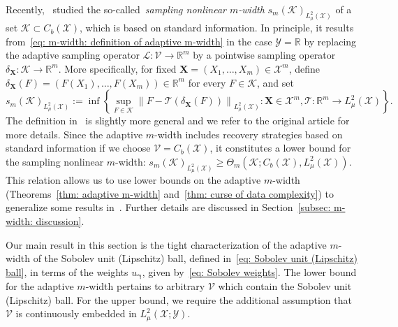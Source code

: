 \documentclass[namedate,webpdf]{ima-authoring-template-blank}
\newcommand*{\nm}[1]{{\left\|#1\right \|}}
\numberwithin{counter}{section}
\numberwithin{equation}{section}
\theoremstyle{plain}
\theoremstyle{definition}
\newcommand*{\cK}{\mathcal{K}}
\newcommand*{\cL}{\mathcal{L}}
\newcommand*{\cT}{\mathcal{T}}
\newcommand*{\cV}{\mathcal{V}}
\newcommand*{\cX}{\mathcal{X}}
\newcommand*{\cY}{\mathcal{Y}}
\newcommand*{\bbR}{\mathbb{R}}
\theoremstyle{thmstyletwo}
\begin{document}
Recently,~\citet{kovachki_DataComplexityEstimatesOperator_2024} studied the so-called~\emph{sampling nonlinear \(m\)-width} \(s_m(\cK)_{L_{\mu}^2(\cX)}\) of a set \(\cK \subset C_b(\cX)\), which is based on standard information. In principle, it results from~\eqref{eq: m-width: definition of adaptive m-width} in the case \( \cY = \bbR \) by replacing the adaptive sampling operator \( \cL : \cV \to \bbR^m \) by a pointwise sampling operator \(\delta_{\bm{X}}: \cK \to \bbR^m\). More specifically, for fixed \(\bm{X} = (X_1, \dots, X_m) \in \cX^m\), define \(\delta_{\bm{X}}(F) = (F(X_1), \dots, F(X_m)) \in \bbR^m\) for every \(F \in \cK\), and set
\begin{equation}
\label{eq: sampling nonlinear width}
    s_m(\cK)_{L_{\mu}^2(\cX)} := 
    \inf \left\{ \sup_{F \in \cK} \nm{F - \cT(\delta_{\bm{X}}(F))}_{L_{\mu}^2(\cX)}: \bm{X} \in \cX^m, \cT: \bbR^m \to L_{\mu}^2(\cX) \right\}.
\end{equation}
The definition in~\citet{kovachki_DataComplexityEstimatesOperator_2024} is slightly more general and we refer to the original article for more details.
Since the adaptive \( m \)-width includes recovery strategies based on standard information if we choose \( \cV = C_b(\cX) \), it constitutes a lower bound for the sampling nonlinear \(m\)-width: \( s_m(\cK)_{L_{\mu}^2(\cX)} \geq \Theta_m(\cK; C_b(\cX), L_{\mu}^2(\cX)) \). This relation allows us to use lower bounds on the adaptive \(m\)-width (Theorems~\ref{thm: adaptive m-width} and~\ref{thm: curse of data complexity}) to generalize some results in~\citet{kovachki_DataComplexityEstimatesOperator_2024}. Further details are discussed in Section~\ref{subsec: m-width: discussion}. 

Our main result in this section is the tight characterization of the adaptive \(m\)-width of the Sobolev unit (Lipschitz) ball, defined in~\eqref{eq: Sobolev unit (Lipschitz) ball}, in terms of the weights \(u_{\bm{\gamma}}\), given by~\eqref{eq: Sobolev weights}. The lower bound for the adaptive \(m\)-width pertains to arbitrary \(\cV\) which contain the Sobolev unit (Lipschitz) ball. For the upper bound, we require the additional assumption that \(\cV\) is continuously embedded in \(L_{\mu}^2(\cX; \cY)\).
\end{document}
